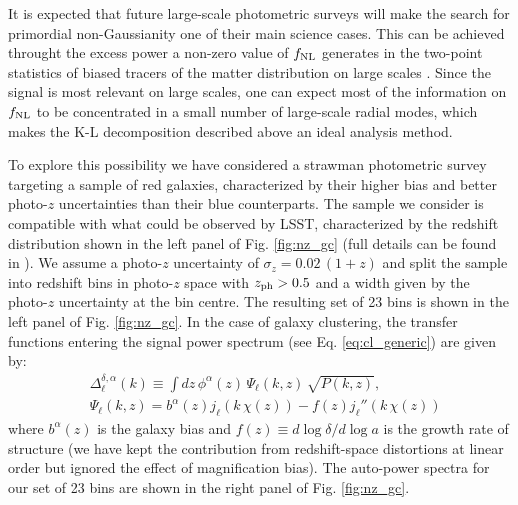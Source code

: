 \documentclass[twocolumn,amsfont,amssymb,amsmath, showpacs,balancelastpage, nofootinbib]{revtex4-1}
\begin{document}
    It is expected that future large-scale photometric surveys will make the search for primordial non-Gaussianity one of their main science cases. This can be achieved throught the excess power a non-zero value of $f_{\rm NL}$ generates in the two-point statistics of biased tracers of the matter distribution on large scales \cite{2000ApJ...541...10M,2008PhRvD..77l3514D}. Since the signal is most relevant on large scales, one can expect most of the information on $f_{\rm NL}$ to be concentrated in a small number of large-scale radial modes, which makes the K-L decomposition described above an ideal analysis method.
    
    To explore this possibility we have considered a strawman photometric survey targeting a sample of red galaxies, characterized by their higher bias and better photo-$z$ uncertainties than their blue counterparts. The sample we consider is compatible with what could be observed by LSST, characterized by the redshift distribution shown in the left panel of Fig. \ref{fig:nz_gc} (full details can be found in \cite{2015ApJ...814..145A}). We assume a photo-$z$ uncertainty of $\sigma_z=0.02\,(1+z)$ and split the sample into redshift bins in photo-$z$ space with $z_{\rm ph}>0.5$ and a width given by the photo-$z$ uncertainty at the bin centre. The resulting set of 23 bins is shown in the left panel of Fig. \ref{fig:nz_gc}. In the case of galaxy clustering, the transfer functions entering the signal power spectrum (see Eq. \ref{eq:cl_generic}) are given by:
    \begin{align}\nonumber
      &\Delta^{\delta,\alpha}_\ell(k)\equiv\int dz\,\phi^\alpha(z)\,\Psi_\ell(k,z)\,\sqrt{P(k,z)},\\\label{eq:tgc_dr}
      &\Psi_\ell(k,z)=b^\alpha(z)j_\ell(k\,\chi(z))-f(z)j_\ell''(k\,\chi(z))
    \end{align}
    where $b^\alpha(z)$ is the galaxy bias and $f(z)\equiv d\log\delta/d\log a$ is the growth rate of structure (we have kept the contribution from redshift-space distortions at linear order but ignored the effect of magnification bias). The auto-power spectra for our set of 23 bins are shown in the right panel of Fig. \ref{fig:nz_gc}.
    
\end{document}
